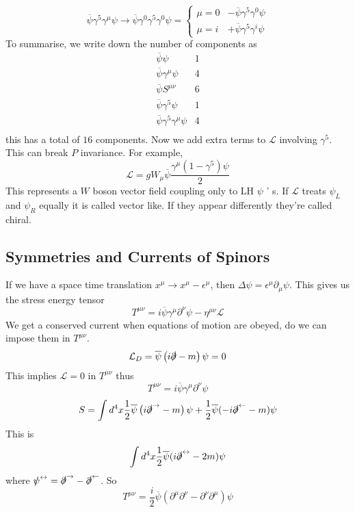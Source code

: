 \[
 \overline{ \psi } \gamma ^ 5 \gamma ^ \mu \psi \to \overline{ \psi } \gamma ^ 0 \gamma ^ 5 \gamma ^ 0 \psi 
  = \begin{cases}
	  \mu = 0 &  - \overline{ \psi } \gamma ^5 \gamma ^ 0 \psi \\
	  \mu = i & + \overline{ \psi } \gamma ^5 \gamma ^ i \psi 
  \end{cases}
\] To summarise, 
we write down the number of components as
\begin{equation}
\begin{aligned}
	\overline{ \psi } \psi &1\\
	\overline{ \psi } \gamma ^ \mu \psi &4\\
	\overline{\psi } S^{ \mu \nu } & 6\\
	\overline{\psi } \gamma ^  5 \psi & 1\\
	\overline{\psi } \gamma ^ 5 \gamma ^ \mu \psi & 4\\ 
\end{aligned} 
\end{equation}this has a total of $ 16 $ components. 
Now we add extra terms to $ \mathcal{ L } $ involving $ \gamma ^ 5 $. This 
can break $ P $ invariance. For example, 
\begin{equation*}
		\mathcal{ L }  = g  W_ \mu \overline{\psi} \frac{ \gamma ^ \mu ( 1 - \gamma ^ 5 ) \psi }{ 2}
\end{equation*}
This represents a $ W $ boson vector field coupling only to LH $\psi$ ' s. 
If $\mathcal{ L }$ treats $\psi _ L$ and $\psi _ R$ equally it is called vector like. 
If they appear differently they're called chiral. 

\subsection{Symmetries and Currents of Spinors} 
If we have a space time translation $x ^ \mu \to x ^ \mu - \epsilon ^ \mu $, 
then  $ \Delta \psi  = \epsilon ^ \mu \partial  _ \mu \psi $. This 
gives us the stress energy tensor 
\[
 T ^{ \mu \nu }  = i \overline{ \psi } \gamma ^ \mu \partial  ^ \nu \psi - \eta ^{ \mu \nu } \mathcal{ L }
\] We get a conserved current when equations of motion 
are obeyed, do we can impose them in $ T ^{ \mu \nu } $. 
\[
	\mathcal{ L } _ D = \overline{ \psi } \left(  
	i \slashed{\partial} - m \right)  \psi  = 0 
\] This implies $ \mathcal{ L }  = 0 $ in $ T ^{ \mu \nu } $ thus 
\[
 T ^{ \mu \nu } = i \overline{ \psi } \gamma ^ \mu \partial  ^ \nu \psi 
\] 
\[
	S = \int  d^ 4 x \frac{1}{ 2 } \overline{ \psi } \left(  i \slashed{\partial}^{ \rightarrow}
	- m \right)  \psi + \frac{1}{2 } \overline{ \psi } ( - i \slashed{\partial} ^{ \leftarrow } - m ) \psi 
\] This is 
\[
	\int d ^ 4 x \frac{1}{2 } \overline{ \psi } ( i \slashed {\partial} ^{ \leftrightarrow} - 2m ) \psi 
\]  where $\slashed{\psi} ^{ \leftrightarrow }  = \slashed{\partial} ^ \rightarrow - \slashed{\partial} ^ 
\leftarrow $. So
\[
	T ^{ \mu \nu }  = \frac{ i }{ 2} \overline{ \psi } ( \partial  ^ \mu \partial  ^ \nu - \partial  ^ \nu \partial  ^ \mu ) \psi 
\]
